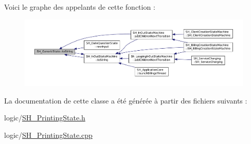 Voici le graphe des appelants de cette fonction \-:
\nopagebreak
\begin{figure}[H]
\begin{center}
\leavevmode
\includegraphics[width=350pt]{classSH__GenericState_a5480c5ee725fd801d8f6292cd4c803b8_icgraph}
\end{center}
\end{figure}




La documentation de cette classe a été générée à partir des fichiers suivants \-:\begin{DoxyCompactItemize}
\item 
logic/\hyperlink{SH__PrintingState_8h}{S\-H\-\_\-\-Printing\-State.\-h}\item 
logic/\hyperlink{SH__PrintingState_8cpp}{S\-H\-\_\-\-Printing\-State.\-cpp}\end{DoxyCompactItemize}
